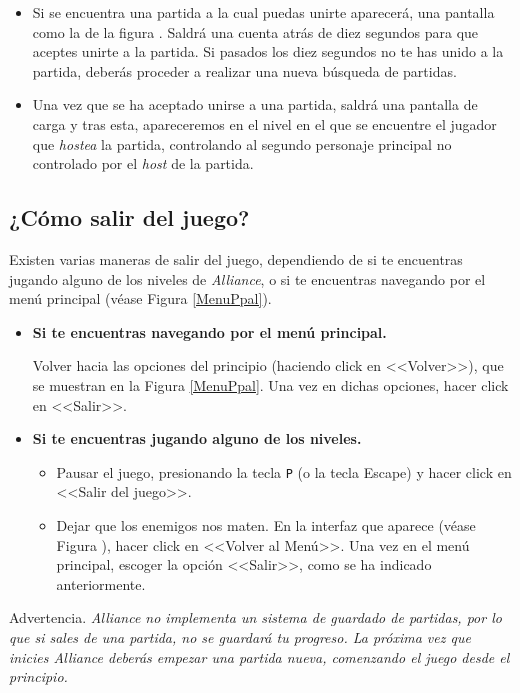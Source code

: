 \begin{itemize}
\item Si se encuentra una partida a la cual puedas unirte aparecerá, una pantalla como la de la figura . Saldrá una cuenta atrás de diez segundos para que aceptes unirte a la partida. Si pasados los diez segundos no te has unido a la partida, deberás proceder a realizar una nueva búsqueda de partidas.

\item Una vez que se ha aceptado unirse a una partida, saldrá una pantalla de carga y tras esta, apareceremos en el nivel en el que se encuentre el jugador que \textit{hostea} la partida, controlando al segundo personaje principal no controlado por el \textit{host} de la partida.
\end{itemize}


\subsection{¿Cómo salir del juego?}

Existen varias maneras de salir del juego, dependiendo de si te encuentras jugando alguno de los niveles de \textit{Alliance}, o si te encuentras navegando por el menú principal (véase Figura \ref{MenuPpal}).

\begin{itemize}
\item \textbf{Si te encuentras navegando por el menú principal.}

Volver hacia las opciones del principio (haciendo click en <<Volver>>), que se muestran en la Figura \ref{MenuPpal}. Una vez en dichas opciones, hacer click en <<Salir>>.

\item \textbf{Si te encuentras jugando alguno de los niveles.}

\begin{itemize}
\item Pausar el juego, presionando la tecla \texttt{P} (o la tecla Escape) y hacer click en <<Salir del juego>>.
\item Dejar que los enemigos nos maten. En la interfaz que aparece (véase Figura ), hacer click en <<Volver al Menú>>. Una vez en el menú principal, escoger la opción <<Salir>>, como se ha indicado anteriormente. 
\end{itemize}
\end{itemize}

\renewcommand\bcStyleTitre[1]{\large\hspace*{1.8in}\textcolor{red!100}{#1}}
\begin{bclogo}[
  couleur=red!15,
  arrondi=0.25,
  logo=\hspace*{1in}\bctakecare,
  barre=none,
  noborder=true]{\hspace*{0.15in} Advertencia.}
\itshape \vspace*{0.15in}
\textit{Alliance} no implementa un sistema de guardado de partidas, por lo que si sales de una partida, no se guardará tu progreso. La próxima vez que inicies \textit{Alliance} deberás empezar una partida nueva, comenzando el juego desde el principio.
\end{bclogo}


